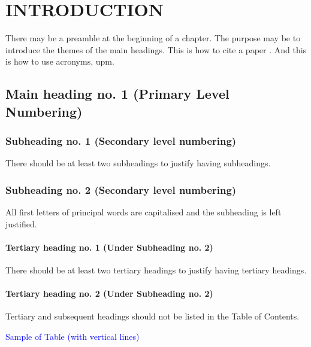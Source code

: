 \chapter{INTRODUCTION}
There may be a preamble at the beginning of a chapter. The purpose may be to introduce the themes of the main headings. This is how to cite a paper \parencite{abdipoor2023meta}. And this is how to use acronyms, \ac{upm}.

\section{Main heading no. 1 (Primary Level Numbering)}

\subsection{Subheading no. 1 (Secondary level numbering)}
There should be at least two subheadings to justify having subheadings.

\subsection{Subheading no. 2 (Secondary level numbering)}
All first letters of principal words are capitalised and the subheading is left justified.

\subsubsection{Tertiary heading no. 1 (Under Subheading no. 2)}
There should be at least two tertiary headings to justify having tertiary headings.

\subsubsection{Tertiary heading no. 2 (Under Subheading no. 2)}
Tertiary and subsequent headings should not be listed in the Table of Contents.

\newpage
\textcolor{blue}{Sample of Table (with vertical lines)}

